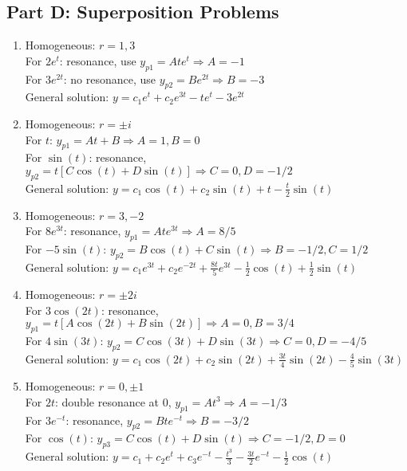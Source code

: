 \documentclass[12pt]{article}
\begin{document}
\subsection*{Part D: Superposition Problems}

\begin{enumerate}[resume]
\item Homogeneous: $r = 1, 3$\\
For $2e^t$: resonance, use $y_{p1} = Ate^t \Rightarrow A = -1$\\
For $3e^{2t}$: no resonance, use $y_{p2} = Be^{2t} \Rightarrow B = -3$\\
General solution: $y = c_1e^t + c_2e^{3t} - te^t - 3e^{2t}$

\item Homogeneous: $r = \pm i$\\
For $t$: $y_{p1} = At + B \Rightarrow A = 1, B = 0$\\
For $\sin(t)$: resonance, $y_{p2} = t[C\cos(t) + D\sin(t)] \Rightarrow C = 0, D = -1/2$\\
General solution: $y = c_1\cos(t) + c_2\sin(t) + t - \frac{t}{2}\sin(t)$

\item Homogeneous: $r = 3, -2$\\
For $8e^{3t}$: resonance, $y_{p1} = Ate^{3t} \Rightarrow A = 8/5$\\
For $-5\sin(t)$: $y_{p2} = B\cos(t) + C\sin(t) \Rightarrow B = -1/2, C = 1/2$\\
General solution: $y = c_1e^{3t} + c_2e^{-2t} + \frac{8t}{5}e^{3t} - \frac{1}{2}\cos(t) + \frac{1}{2}\sin(t)$

\item Homogeneous: $r = \pm 2i$\\
For $3\cos(2t)$: resonance, $y_{p1} = t[A\cos(2t) + B\sin(2t)] \Rightarrow A = 0, B = 3/4$\\
For $4\sin(3t)$: $y_{p2} = C\cos(3t) + D\sin(3t) \Rightarrow C = 0, D = -4/5$\\
General solution: $y = c_1\cos(2t) + c_2\sin(2t) + \frac{3t}{4}\sin(2t) - \frac{4}{5}\sin(3t)$

\item Homogeneous: $r = 0, \pm 1$\\
For $2t$: double resonance at 0, $y_{p1} = At^3 \Rightarrow A = -1/3$\\
For $3e^{-t}$: resonance, $y_{p2} = Bte^{-t} \Rightarrow B = -3/2$\\
For $\cos(t)$: $y_{p3} = C\cos(t) + D\sin(t) \Rightarrow C = -1/2, D = 0$\\
General solution: $y = c_1 + c_2e^t + c_3e^{-t} - \frac{t^3}{3} - \frac{3t}{2}e^{-t} - \frac{1}{2}\cos(t)$
\end{enumerate}
\end{document}
